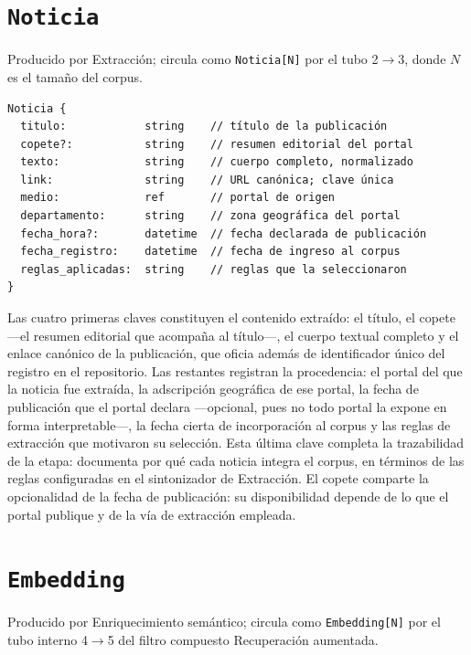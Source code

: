 \documentclass[12pt]{report}
\begin{document}
\section{\texorpdfstring{\texttt{Noticia}}{Noticia}}
\label{anexo:tipo-noticia}

Producido por Extracción; circula como \texttt{Noticia[N]} por el tubo 2\(\to\)3, donde \(N\) es el tamaño del corpus.

\noindent\begin{minipage}{\linewidth}
  \begin{lstlisting}[style=tipoanexo]
Noticia {
  titulo:            string    // título de la publicación
  copete?:           string    // resumen editorial del portal
  texto:             string    // cuerpo completo, normalizado
  link:              string    // URL canónica; clave única
  medio:             ref       // portal de origen
  departamento:      string    // zona geográfica del portal
  fecha_hora?:       datetime  // fecha declarada de publicación
  fecha_registro:    datetime  // fecha de ingreso al corpus
  reglas_aplicadas:  string    // reglas que la seleccionaron
}
\end{lstlisting}
\end{minipage}

Las cuatro primeras claves constituyen el contenido extraído: el título, el copete ---el resumen editorial que acompaña al título---, el cuerpo textual completo y el enlace canónico de la publicación, que oficia además de identificador único del registro en el repositorio. Las restantes registran la procedencia: el portal del que la noticia fue extraída, la adscripción geográfica de ese portal, la fecha de publicación que el portal declara ---opcional, pues no todo portal la expone en forma interpretable---, la fecha cierta de incorporación al corpus y las reglas de extracción que motivaron su selección. Esta última clave completa la trazabilidad de la etapa: documenta por qué cada noticia integra el corpus, en términos de las reglas configuradas en el sintonizador de Extracción. El copete comparte la opcionalidad de la fecha de publicación: su disponibilidad depende de lo que el portal publique y de la vía de extracción empleada.

\section{\texorpdfstring{\texttt{Embedding}}{Embedding}}
\label{anexo:tipo-embedding}

Producido por Enriquecimiento semántico; circula como \texttt{Embedding[N]} por el tubo interno 4\(\to\)5 del filtro compuesto Recuperación aumentada.
\end{document}
